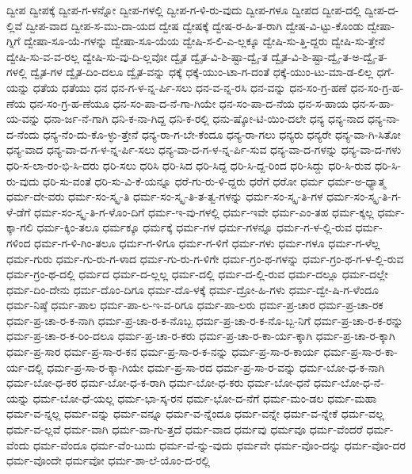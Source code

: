 {ದ್ವೀಪ
ದ್ವೀಪಕ್ಕೆ
ದ್ವೀಪ-ಗ-ಳನ್ನೋ
ದ್ವೀಪ-ಗಳಲ್ಲಿ
ದ್ವೀಪ-ಗ-ಳಿ-ರು-ವುದು
ದ್ವೀಪ-ಗಳೂ
ದ್ವೀಪದ
ದ್ವೀಪ-ದಲ್ಲಿ
ದ್ವೀಪ-ದ-ಲ್ಲಿವೆ
ದ್ವೀಪ-ವಾದ
ದ್ವೀಪ-ಸ-ಮು-ದಾ-ಯದ
ದ್ವೇಷ
ದ್ವೇಷಕ್ಕೆ
ದ್ವೇಷ-ರ-ಹಿ-ತ-ರಾಗಿ
ದ್ವೇಷ-ವಿ-ಟ್ಟು-ಕೊಂಡು
ದ್ವೇಷಾ-ಗ್ನಿಗೆ
ದ್ವೇಷಾ-ಸೂ-ಯೆ-ಗಳನ್ನು
ದ್ವೇಷಾ-ಸೂ-ಯೆಯ
ದ್ವೇಷಿ-ಸ-ಲಿ-ಎ-ಲ್ಲಕ್ಕೂ
ದ್ವೇಷಿ-ಸು-ತ್ತಿ-ದ್ದರು
ದ್ವೇಷಿ-ಸು-ತ್ತೇನೆ
ದ್ವೇಷಿ-ಸು-ವ-ವ-ರಲ್ಲ
ದ್ವೇಷಿ-ಸು-ವು-ದಿ-ಲ್ಲವೋ
ದ್ವೈತ
ದ್ವೈತ-ವಿ-ಶಿ-ಷ್ಟಾ-ದ್ವೈ-ತ
ದ್ವೈತ-ವಿ-ಶಿ-ಷ್ಟಾ-ದ್ವೈ-ತ-ಅ-ದ್ವೈ-ತ-ಗಳಲ್ಲಿ
ದ್ವೈತ-ಗಳ
ದ್ವೈತ-ದಿಂ-ದಲೂ
ದ್ವೈತ-ವನ್ನು
ಧಕ್ಕೆ
ಧಕ್ಕೆ-ಯುಂ-ಟಾ-ಗ-ದಂತೆ
ಧಕ್ಕೆ-ಯುಂ-ಟು-ಮಾ-ಡ-ಲಿಲ್ಲ
ಧಗೆ-ಯನ್ನು
ಧತೆಯ
ಧತೆಯು
ಧನ
ಧನ-ಗ-ಳ-ನ್ನ-ರ್ಪಿ-ಸಲು
ಧನ-ವ-ನ್ನ-ರಸಿ
ಧನ-ವನ್ನು
ಧನ-ಸಂ-ಗ್ರ-ಹಣೆ
ಧನ-ಸಂ-ಗ್ರ-ಹ-ಣೆಯ
ಧನ-ಸಂ-ಗ್ರ-ಹ-ಣೆಯೂ
ಧನ-ಸಂ-ಪಾ-ದ-ನೆ-ಗಾ-ಗಿಯೇ
ಧನ-ಸಂ-ಪಾ-ದ-ನೆಯ
ಧನ-ಸ-ಹಾಯ
ಧನ-ಸ-ಹಾ-ಯ-ವನ್ನು
ಧನಾ-ರ್ಜ-ನೆ-ಗಾಗಿ
ಧನಿ-ಕ-ನಾ-ಗಿದ್ದ
ಧನಿ-ಕ-ರಲ್ಲಿ
ಧನು-ಷ್ಕೋ-ಟಿ-ಯಿಂ-ದಲೇ
ಧನ್ಯ
ಧನ್ಯ-ನಾದ
ಧನ್ಯ-ನಾ-ದ-ನೆಂದು
ಧನ್ಯ-ನೆಂ-ದು-ಕೊ-ಳ್ಳು-ತ್ತೇನೆ
ಧನ್ಯ-ರಾ-ಗ-ಬೇ-ಕೆಂದೂ
ಧನ್ಯ-ರಾ-ಗಲು
ಧನ್ಯರು
ಧನ್ಯರೇ
ಧನ್ಯ-ವಾ-ಗಿ-ಸಿತೋ
ಧನ್ಯ-ವಾದ
ಧನ್ಯ-ವಾ-ದ-ಗ-ಳ-ನ್ನ-ರ್ಪಿ-ಸಲು
ಧನ್ಯ-ವಾ-ದ-ಗ-ಳ-ನ್ನ-ರ್ಪಿ-ಸುವ
ಧನ್ಯ-ವಾ-ದ-ಗಳನ್ನು
ಧನ್ಯ-ವಾ-ದ-ಗಳು
ಧರಿ-ಸ-ಲಾ-ರಂ-ಭಿ-ಸಿ-ದರು
ಧರಿ-ಸಲು
ಧರಿಸಿ
ಧರಿ-ಸಿದ
ಧರಿ-ಸಿದ್ದ
ಧರಿ-ಸಿ-ದ್ದ-ರಿಂದ
ಧರಿ-ಸಿದ್ದು
ಧರಿ-ಸಿ-ರುವ
ಧರಿ-ಸಿ-ರು-ವುದು
ಧರಿ-ಸು-ವಂತೆ
ಧರಿ-ಸು-ವಿ-ಕೆ-ಯನ್ನೂ
ಧರೆ-ಗು-ರು-ಳಿ-ದ್ದರು
ಧರೆಗೆ
ಧರೋ
ಧರ್ಮ
ಧರ್ಮ-ಅ-ಧ್ಯಾತ್ಮ
ಧರ್ಮ-ದೇ-ವರು
ಧರ್ಮ-ಸಂ-ಸ್ಕೃ-ತಿ
ಧರ್ಮ-ಸಂ-ಸ್ಕೃ-ತಿ-ತ-ತ್ವ-ಗಳನ್ನು
ಧರ್ಮ-ಸಂ-ಸ್ಕೃ-ತಿ-ಗಳ
ಧರ್ಮ-ಸಂ-ಸ್ಕೃ-ತಿ-ಗ-ಳೆ-ಡೆಗೆ
ಧರ್ಮ-ಸಂ-ಸ್ಕೃ-ತಿ-ಗ-ಳೊಂ-ದಿಗೆ
ಧರ್ಮ-ಇ-ವು-ಗಳಲ್ಲಿ
ಧರ್ಮ-ಇವೇ
ಧರ್ಮ-ಎಂ-ತಹ
ಧರ್ಮ-ಕ್ಕಲ್ಲ
ಧರ್ಮ-ಕ್ಕಾ-ಗಲಿ
ಧರ್ಮ-ಕ್ಕಿಂ-ತಲೂ
ಧರ್ಮಕ್ಕೂ
ಧರ್ಮಕ್ಕೆ
ಧರ್ಮ-ಗಳ
ಧರ್ಮ-ಗಳನ್ನೂ
ಧರ್ಮ-ಗ-ಳ-ಲ್ಲಿ-ರುವ
ಧರ್ಮ-ಗಳಿಂದ
ಧರ್ಮ-ಗ-ಳಿ-ಗಿಂ-ತಲೂ
ಧರ್ಮ-ಗ-ಳಿಗೂ
ಧರ್ಮ-ಗ-ಳಿಗೆ
ಧರ್ಮ-ಗಳು
ಧರ್ಮ-ಗಳೂ
ಧರ್ಮ-ಗ-ಳೆಲ್ಲ
ಧರ್ಮ-ಗುರು
ಧರ್ಮ-ಗು-ರು-ಗ-ಳಾದ
ಧರ್ಮ-ಗು-ರು-ಗ-ಳಿಗೇ
ಧರ್ಮ-ಗ್ರಂ-ಥ-ಗಳನ್ನು
ಧರ್ಮ-ಗ್ರಂ-ಥ-ಗ-ಳ-ಲ್ಲಿ-ರುವ
ಧರ್ಮ-ಗ್ರಂ-ಥ-ದಲ್ಲಿ
ಧರ್ಮದ
ಧರ್ಮ-ದ-ಲ್ಲಲ್ಲ
ಧರ್ಮ-ದಲ್ಲಿ
ಧರ್ಮ-ದ-ಲ್ಲಿ-ರುವ
ಧರ್ಮ-ದಲ್ಲೂ
ಧರ್ಮ-ದಲ್ಲೇ
ಧರ್ಮ-ದಿಂ-ದೇನು
ಧರ್ಮ-ದೊಂ-ದಿಗೂ
ಧರ್ಮ-ದೊ-ಳಕ್ಕೆ
ಧರ್ಮ-ದ್ರೋ-ಹಿ-ಗಳು
ಧರ್ಮ-ದ್ವೇ-ಷಿ-ಗ-ಳೆಂದೂ
ಧರ್ಮ-ನಿಷ್ಠೆ
ಧರ್ಮ-ಪಾಲ
ಧರ್ಮ-ಪಾ-ಲ-ಇ-ವ-ರಿಗೂ
ಧರ್ಮ-ಪಾ-ಲರು
ಧರ್ಮ-ಪ್ರ-ಚಾರ
ಧರ್ಮ-ಪ್ರ-ಚಾ-ರಕ
ಧರ್ಮ-ಪ್ರ-ಚಾ-ರ-ಕ-ನಾಗಿ
ಧರ್ಮ-ಪ್ರ-ಚಾ-ರ-ಕ-ನೊಬ್ಬ
ಧರ್ಮ-ಪ್ರ-ಚಾ-ರ-ಕ-ನೊ-ಬ್ಬ-ನಿಗೆ
ಧರ್ಮ-ಪ್ರ-ಚಾ-ರ-ಕ-ರನ್ನು
ಧರ್ಮ-ಪ್ರ-ಚಾ-ರ-ಕ-ರಿಂ-ದಲೂ
ಧರ್ಮ-ಪ್ರ-ಚಾ-ರ-ಕರು
ಧರ್ಮ-ಪ್ರ-ಚಾ-ರ-ಕಾ-ರ್ಯ-ಕ್ಕಾಗಿ
ಧರ್ಮ-ಪ್ರ-ಚಾ-ರ-ಕ್ಕಾಗಿ
ಧರ್ಮ-ಪ್ರ-ಸಾರ
ಧರ್ಮ-ಪ್ರ-ಸಾ-ರ-ಕನ
ಧರ್ಮ-ಪ್ರ-ಸಾ-ರ-ಕ-ನನ್ನು
ಧರ್ಮ-ಪ್ರ-ಸಾ-ರ-ಕಾರ್ಯ
ಧರ್ಮ-ಪ್ರ-ಸಾ-ರ-ಕಾ-ರ್ಯ-ದಲ್ಲಿ
ಧರ್ಮ-ಪ್ರ-ಸಾ-ರ-ಕ್ಕಾ-ಗಿಯೇ
ಧರ್ಮ-ಪ್ರ-ಸಾ-ರದ
ಧರ್ಮ-ಪ್ರ-ಸಾ-ರ-ವನ್ನು
ಧರ್ಮ-ಬೋ-ಧ-ಕ-ನಾಗಿ
ಧರ್ಮ-ಬೋ-ಧ-ಕರ
ಧರ್ಮ-ಬೋ-ಧ-ಕ-ರಾಗಿ
ಧರ್ಮ-ಬೋ-ಧ-ಕರು
ಧರ್ಮ-ಬೋ-ಧನೆ
ಧರ್ಮ-ಬೋ-ಧ-ನೆ-ಯನ್ನು
ಧರ್ಮ-ಬೋ-ಧೆ-ಯಲ್ಲ
ಧರ್ಮ-ಭಾ-ಸ್ಕ-ರನ
ಧರ್ಮ-ಭೋ-ದ-ನೆಗೆ
ಧರ್ಮ-ಮಂ-ಡಲ
ಧರ್ಮ-ಮಹಾ
ಧರ್ಮ-ವ-ನ್ನಲ್ಲ
ಧರ್ಮ-ವನ್ನು
ಧರ್ಮ-ವನ್ನೂ
ಧರ್ಮ-ವ-ನ್ನೆಂದೂ
ಧರ್ಮ-ವನ್ನೇ
ಧರ್ಮ-ವ-ನ್ನೇಕೆ
ಧರ್ಮ-ವಲ್ಲ
ಧರ್ಮ-ವ-ಲ್ಲವೆ
ಧರ್ಮ-ವಾಗಿ
ಧರ್ಮ-ವಾ-ಗು-ತ್ತದೆ
ಧರ್ಮ-ವಾದ
ಧರ್ಮವು
ಧರ್ಮವೂ
ಧರ್ಮ-ವೆಂದರೆ
ಧರ್ಮ-ವೆಂದು
ಧರ್ಮ-ವೆಂದೂ
ಧರ್ಮ-ವೆಂ-ಬುದು
ಧರ್ಮ-ವೆ-ನ್ನು-ವುದು
ಧರ್ಮವೇ
ಧರ್ಮ-ವೊಂ-ದನ್ನು
ಧರ್ಮ-ವೊಂ-ದರ
ಧರ್ಮ-ವೊಂದೇ
ಧರ್ಮವೋ
ಧರ್ಮ-ಶಾ-ಲೆ-ಯೊಂ-ದ-ರಲ್ಲಿ
}
